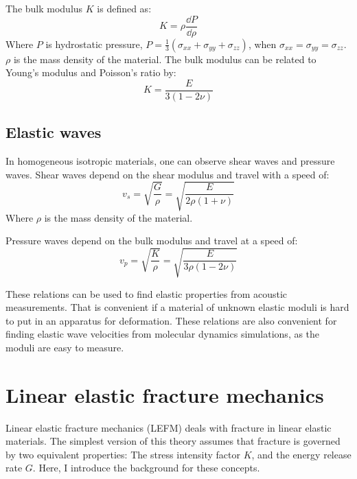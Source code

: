 The bulk modulus $K$ is defined as:
\begin{equation}
	K = \rho\frac{\dd P}{\dd \rho}
\end{equation}
Where $P$ is hydrostatic pressure, $P = \frac{1}{3} \left(\sigma_{xx}+\sigma_{yy}+\sigma_{zz}\right)$, when $\sigma_{xx} = \sigma_{yy} = \sigma_{zz}$. $\rho$ is the mass density of the material.
The bulk modulus can be related to Young's modulus and Poisson's ratio by:\begin{equation}
	K = \frac{E}{3(1-2\nu)}
\end{equation}

\subsection{Elastic waves}
In homogeneous isotropic materials, one can observe shear waves and pressure waves. Shear waves depend on the shear modulus and travel with a speed of:
\begin{equation}
	v_s = \sqrt{\frac{G}{\rho}} = \sqrt{\frac{E}{2\rho(1+\nu)}}
\end{equation}
Where $\rho$ is the mass density of the material.

Pressure waves depend on the bulk modulus and travel at a speed of:
\begin{equation}
	v_p = \sqrt{\frac{K}{\rho}} = \sqrt{\frac{E}{3\rho(1-2\nu)}}
\end{equation}

These relations can be used to find elastic properties from acoustic measurements. That is convenient if a material of unknown elastic moduli is hard to put in an apparatus for deformation. These relations are also convenient for finding elastic wave velocities from molecular dynamics simulations, as the moduli are easy to measure.


\section{Linear elastic fracture mechanics}
Linear elastic fracture mechanics (LEFM) deals with fracture in linear elastic materials. The simplest version of this theory assumes that fracture is governed by two equivalent properties: The stress intensity factor $K$, and the energy release rate $G$. Here, I introduce the background for these concepts.

